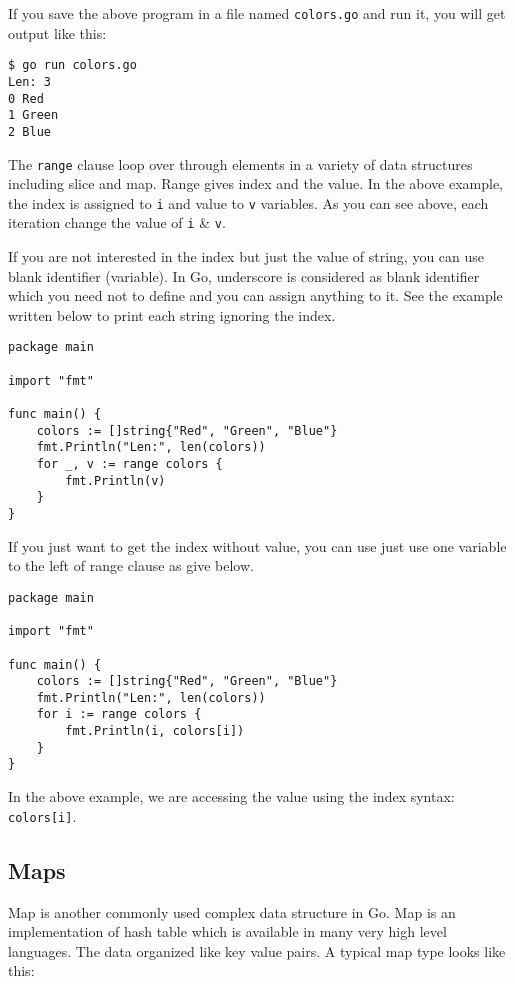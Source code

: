 If you save the above program in a file named \texttt{colors.go} and
run it, you will get output like this:

\begin{lstlisting}[numbers=none]
$ go run colors.go
Len: 3
0 Red
1 Green
2 Blue
\end{lstlisting}

The \texttt{range} clause loop over through elements in a
variety of data structures including slice and map.  Range gives index
and the value.  In the above example, the index is assigned
to \texttt{i} and value to \texttt{v} variables.  As you can see
above, each iteration change the value of \texttt{i} \& \texttt{v}.

If you are not interested in the index but just the value of string,
you can use blank identifier (variable).  In Go, underscore is
considered as blank identifier which you need not to define and you can
assign anything to it.  See the example written below to print each
string ignoring the index.

\begin{lstlisting}[caption=Range loop with index ignored]
package main

import "fmt"

func main() {
    colors := []string{"Red", "Green", "Blue"}
    fmt.Println("Len:", len(colors))
    for _, v := range colors {
        fmt.Println(v)
    }
}
\end{lstlisting}

If you just want to get the index without value, you can use just use
one variable to the left of range clause as give below.

\begin{lstlisting}[caption=Range loop without index]
package main

import "fmt"

func main() {
    colors := []string{"Red", "Green", "Blue"}
    fmt.Println("Len:", len(colors))
    for i := range colors {
        fmt.Println(i, colors[i])
    }
}
\end{lstlisting}

In the above example, we are accessing the value using the index
syntax: \texttt{colors[i]}.

\subsection{Maps}

Map is another commonly used complex data structure in Go.
Map is an implementation of hash table which is available in many very
high level languages.  The data organized like key value pairs.  A
typical map type looks like this:

